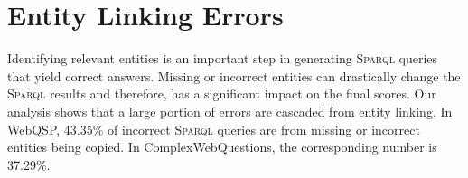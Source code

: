 \documentclass{article}
\newcommand{\spql}{\textsc{Sparql}\xspace}
\begin{document}
\section{Entity Linking Errors}
Identifying relevant entities is an important step in generating \spql queries that yield correct answers. Missing or incorrect entities can drastically change the \spql results and therefore, has a significant impact on the final scores. Our analysis shows that a large portion of errors are cascaded from entity linking. In WebQSP, 43.35\% of incorrect \spql queries are from missing or incorrect entities being copied. In ComplexWebQuestions, the corresponding number is 37.29\%. 
 
\end{document}

